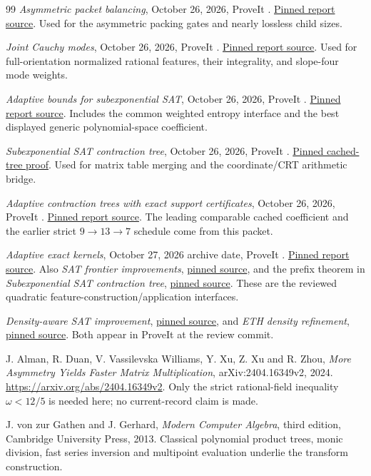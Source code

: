 \begin{thebibliography}{99}
\emph{Asymmetric packet balancing}, October 26, 2026,
ProveIt .
\href{\baseurl eth_asymmetric_packet_balancing/report.tex}{Pinned report source}.
Used for the asymmetric packing gates and nearly lossless child sizes.

\emph{Joint Cauchy modes}, October 26, 2026,
ProveIt .
\href{\baseurl eth_joint_cauchy/report.tex}{Pinned report source}.
Used for full-orientation normalized rational features, their integrality,
and slope-four mode weights.

\emph{Adaptive bounds for subexponential SAT}, October 26, 2026,
ProveIt .
\href{\baseurl sat_adaptive_bounds/report/report.tex}{Pinned report source}.
Includes the common weighted entropy interface and the best displayed
generic polynomial-space coefficient.

\emph{Subexponential SAT contraction tree}, October 26, 2026,
ProveIt .
\href{\baseurl subsat_contraction_tree/report/cached_tree.tex}{Pinned cached-tree proof}.
Used for matrix table merging and the coordinate/CRT arithmetic bridge.

\emph{Adaptive contraction trees with exact support certificates},
October 26, 2026,
ProveIt .
\href{\baseurl sat_adaptive_tree_certificate/report.tex}{Pinned report source}.
The leading comparable cached coefficient and the earlier strict
$9\to13\to7$ schedule come from this packet.

\emph{Adaptive exact kernels}, October 27, 2026 archive date,
ProveIt .
\href{\baseurl eth_adaptive_exact_kernels/report.tex}{Pinned report source}.
Also \emph{SAT frontier improvements},
\href{\baseurl sat_frontier_improvements/report.tex}{pinned source}, and
the prefix theorem in \emph{Subexponential SAT contraction tree},
\href{\baseurl subsat_contraction_tree/report/prefix_theorem.tex}{pinned source}.
These are the reviewed quadratic feature-construction/application interfaces.

\emph{Density-aware SAT improvement},
\href{\baseurl sat_density_improvement/density_aware_sat_improvement.tex}{pinned source},
and \emph{ETH density refinement},
\href{\baseurl eth_density_refinement/report.tex}{pinned source}.
Both appear in ProveIt at the review commit.

J. Alman, R. Duan, V. Vassilevska Williams, Y. Xu, Z. Xu and R. Zhou,
\emph{More Asymmetry Yields Faster Matrix Multiplication},
arXiv:2404.16349v2, 2024.
\url{https://arxiv.org/abs/2404.16349v2}.
Only the strict rational-field inequality $\omega<12/5$ is needed here;
no current-record claim is made.

J. von zur Gathen and J. Gerhard, \emph{Modern Computer Algebra},
third edition, Cambridge University Press, 2013. Classical polynomial
product trees, monic division, fast series inversion and multipoint
evaluation underlie the transform construction.
\end{thebibliography}
